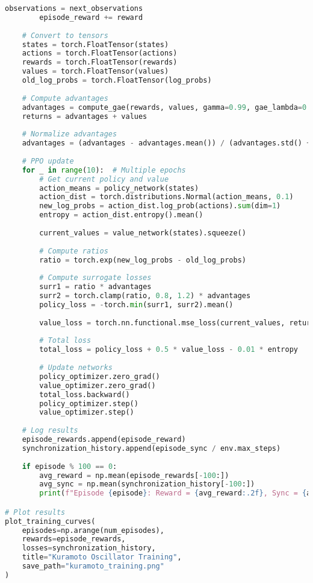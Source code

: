 \begin{lstlisting}[language=python, caption=PPO Training Example]
        observations = next_observations
        episode_reward += reward
    
    # Convert to tensors
    states = torch.FloatTensor(states)
    actions = torch.FloatTensor(actions)
    rewards = torch.FloatTensor(rewards)
    values = torch.FloatTensor(values)
    old_log_probs = torch.FloatTensor(log_probs)
    
    # Compute advantages
    advantages = compute_gae(rewards, values, gamma=0.99, gae_lambda=0.95)
    returns = advantages + values
    
    # Normalize advantages
    advantages = (advantages - advantages.mean()) / (advantages.std() + 1e-8)
    
    # PPO update
    for _ in range(10):  # Multiple epochs
        # Get current policy and value
        action_means = policy_network(states)
        action_dist = torch.distributions.Normal(action_means, 0.1)
        new_log_probs = action_dist.log_prob(actions).sum(dim=1)
        entropy = action_dist.entropy().mean()
        
        current_values = value_network(states).squeeze()
        
        # Compute ratios
        ratio = torch.exp(new_log_probs - old_log_probs)
        
        # Compute surrogate losses
        surr1 = ratio * advantages
        surr2 = torch.clamp(ratio, 0.8, 1.2) * advantages
        policy_loss = -torch.min(surr1, surr2).mean()
        
        value_loss = torch.nn.functional.mse_loss(current_values, returns)
        
        # Total loss
        total_loss = policy_loss + 0.5 * value_loss - 0.01 * entropy
        
        # Update networks
        policy_optimizer.zero_grad()
        value_optimizer.zero_grad()
        total_loss.backward()
        policy_optimizer.step()
        value_optimizer.step()
    
    # Log results
    episode_rewards.append(episode_reward)
    synchronization_history.append(episode_sync / env.max_steps)
    
    if episode % 100 == 0:
        avg_reward = np.mean(episode_rewards[-100:])
        avg_sync = np.mean(synchronization_history[-100:])
        print(f"Episode {episode}: Reward = {avg_reward:.2f}, Sync = {avg_sync:.3f}")

# Plot results
plot_training_curves(
    episodes=np.arange(num_episodes),
    rewards=episode_rewards,
    losses=synchronization_history,
    title="Kuramoto Oscillator Training",
    save_path="kuramoto_training.png"
)


\end{lstlisting}
